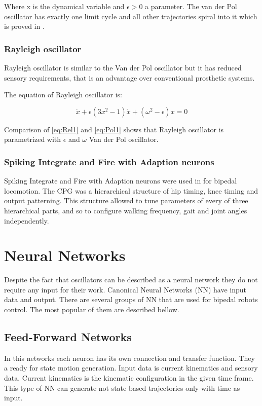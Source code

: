 \documentclass[12pt,a4paper]{report}
\begin{document}
				Where x is the dynamical variable and $\epsilon > 0$ a parameter.
				The van der Pol oscillator has exactly one limit cycle and all other trajectories spiral into it which is proved in \cite{kanamaru2007van}.
			\subsubsection{Rayleigh oscillator}
				Rayleigh oscillator is similar to the Van der Pol oscillator but it has reduced sensory requirements, that is an advantage over conventional prosthetic systems.
				
				The equation of Rayleigh oscillator is:
				
				\begin{equation}\label{eq:Rel1}
					\ddot{x} + \epsilon(3x^2 - 1)\dot{x} + (\omega^2 - \epsilon)x = 0
				\end{equation}
				
				Comparison of \ref{eq:Rel1} and \ref{eq:Pol1} shows that Rayleigh oscillator is parametrized with $\epsilon$ and $\omega$ Van der Pol oscillator.
			\subsubsection{Spiking Integrate and Fire with Adaption neurons}
				Spiking Integrate and Fire with Adaption neurons were used in \cite{russell2007configuring} for bipedal locomotion. The CPG was a hierarchical structure of hip timing, knee timing and output patterning. This structure allowed to tune parameters of every of three hierarchical parts, and so to configure walking frequency, gait and joint angles independently.
		\section{Neural Networks}
		Despite the fact that oscillators can be described as a neural network they do not require any input for their work. Canonical Neural Networks (NN) have input data and output. There are several groups of NN that are used for bipedal robots control. The most popular of them are described bellow.

			\subsection{Feed-Forward Networks}
				In this networks each neuron has its own connection and transfer function. They a ready for state motion generation.  Input data is current kinematics and sensory data. Current kinematics is the kinematic configuration in the given time frame. This type of NN can generate not state based trajectories only with time as input. 
\end{document}
